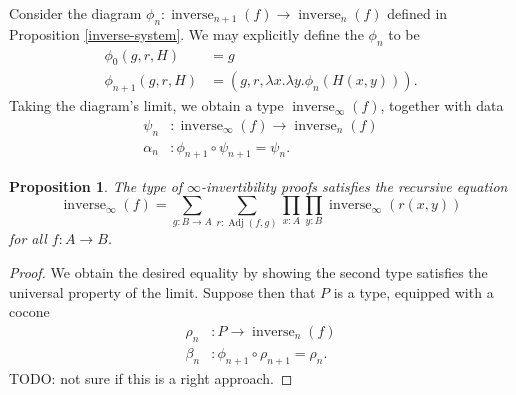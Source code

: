 \documentclass{article}
\theoremstyle{plain}
\newtheorem{proposition}[theorem]{Proposition}
\theoremstyle{definition}
\theoremstyle{remark}
\DeclareMathOperator{\inverse}{inverse}
\DeclareMathOperator{\adj}{Adj}
\newcommand{\ninverse}[1]{\inverse_{#1}}
\begin{document}
Consider the diagram \(\phi_{n} : \ninverse{n + 1}(f) \to \ninverse{n}(f)\) defined
in Proposition \ref{inverse-system}. We may explicitly define the \(\phi_{n}\) to be
\begin{align*}
  \phi_{0}(g, r, H)     &= g \\
  \phi_{n + 1}(g, r, H) &= (g, r, \lambda x.\lambda y.\phi_{n}(H(x, y))).
\end{align*}
Taking the diagram's limit, we obtain a type \(\ninverse{\infty}(f)\), together with data
\begin{align*}
  \psi_{n}   &: \ninverse{\infty}(f) \to \ninverse{n}(f) \\
  \alpha_{n} &: \phi_{n + 1} \circ \psi_{n + 1} = \psi_{n}.
\end{align*}

\begin{proposition}
  The type of \(\infty\)-invertibility proofs satisfies the recursive equation
  \[\ninverse{\infty}(f) =
    \sum_{g : B \to A}\sum_{r : \adj(f, g)}
    \prod_{x : A}\prod_{y : B}\ninverse{\infty}(r(x, y))\]
  for all \(f : A \to B\).
\end{proposition}

\begin{proof}
  We obtain the desired equality by showing the second type satisfies the universal property
  of the limit. Suppose then that \(P\) is a type, equipped with a cocone
  \begin{align*}
    \rho_{n}     &: P \to \ninverse{n}(f) \\
    \beta_{n} &: \phi_{n + 1} \circ \rho_{n + 1} = \rho_{n}.
  \end{align*}
  TODO: not sure if this is a right approach.
\end{proof}
\end{document}
